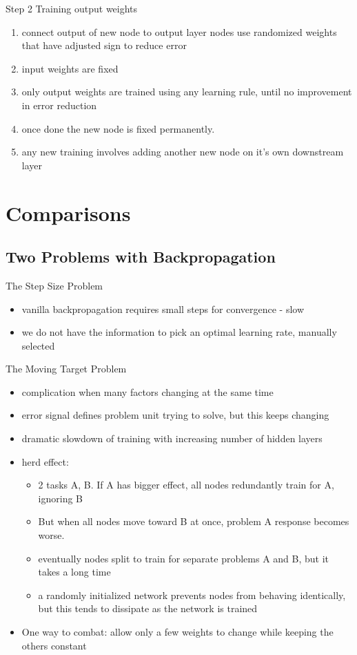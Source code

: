 \documentclass[presentation]{beamer}
\begin{document}
\begin{frame}[label={sec:org085d5cb}]{Step 2 Training output weights}
\begin{enumerate}
\item connect output of new node to output layer nodes
use randomized weights that have adjusted sign to reduce error
\item input weights are fixed
\item only output weights are trained using any learning rule, until no improvement in error reduction

\item once done the new node is fixed permanently.
\item any new training involves adding another new node on it's own downstream layer
\end{enumerate}
\end{frame}
\section{Comparisons}
\label{sec:org8f2bd35}
\subsection{Two Problems with Backpropagation}
\label{sec:org168fc30}
\begin{frame}[label={sec:org200ccae}]{The Step Size Problem}
\begin{itemize}
\item vanilla backpropagation requires small steps for convergence - slow
\item we do not have the information to pick an optimal learning rate, manually selected
\end{itemize}
\end{frame}
\begin{frame}[label={sec:orgde08e3c}]{The Moving Target Problem}
\begin{itemize}
\item complication when many factors changing at the same time
\item error signal defines problem unit trying to solve, but this keeps changing
\item dramatic slowdown of training with increasing number of hidden layers
\item herd effect:
\begin{itemize}
\item 2 tasks A, B. If A has bigger effect, all nodes redundantly train for A, ignoring B
\item But when all nodes move toward B at once, problem A response becomes worse.
\item eventually nodes split to train for separate problems A and B, but it takes a long time
\item a randomly initialized network prevents nodes from behaving identically, but this tends to dissipate as the network is trained
\end{itemize}
\item One way to combat: allow only a few weights to change while keeping the others constant
\end{itemize}
\end{frame}
\end{document}
